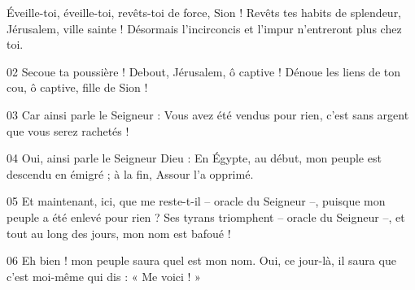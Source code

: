 Éveille-toi, éveille-toi, revêts-toi de force, Sion ! Revêts tes habits de splendeur, Jérusalem, ville sainte ! Désormais l’incirconcis et l’impur n’entreront plus chez toi.

02 Secoue ta poussière ! Debout, Jérusalem, ô captive ! Dénoue les liens de ton cou, ô captive, fille de Sion !

03 Car ainsi parle le Seigneur : Vous avez été vendus pour rien, c’est sans argent que vous serez rachetés !

04 Oui, ainsi parle le Seigneur Dieu : En Égypte, au début, mon peuple est descendu en émigré ; à la fin, Assour l’a opprimé.

05 Et maintenant, ici, que me reste-t-il – oracle du Seigneur –, puisque mon peuple a été enlevé pour rien ? Ses tyrans triomphent – oracle du Seigneur –, et tout au long des jours, mon nom est bafoué !

06 Eh bien ! mon peuple saura quel est mon nom. Oui, ce jour-là, il saura que c’est moi-même qui dis : « Me voici ! »